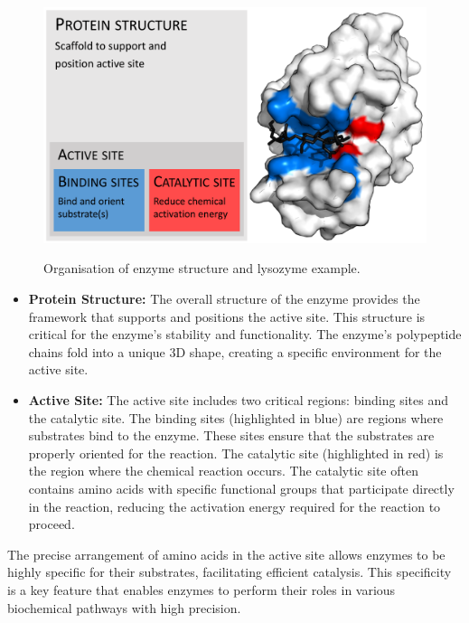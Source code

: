 \begin{figure}[hbt]
    \centering
    \begin{minipage}[t]{.9\textwidth}
    \caption{Organisation of enzyme structure and lysozyme example.}
    \includegraphics[width=1\textwidth]{img/EnzymeStructure.svg.png}\\
    \label{fig:EnzymeStructure}
    \end{minipage}
\end{figure}

\begin{itemize}
    \item \textbf{Protein Structure:} The overall structure of the enzyme provides the framework that supports and positions the active site. This structure is critical for the enzyme's stability and functionality. The enzyme's polypeptide chains fold into a unique 3D shape, creating a specific environment for the active site.
    \item \textbf{Active Site:} The active site includes two critical regions: binding sites and the catalytic site. The binding sites (highlighted in blue) are regions where substrates bind to the enzyme. These sites ensure that the substrates are properly oriented for the reaction. The catalytic site (highlighted in red) is the region where the chemical reaction occurs. The catalytic site often contains amino acids with specific functional groups that participate directly in the reaction, reducing the activation energy required for the reaction to proceed.
\end{itemize}

The precise arrangement of amino acids in the active site allows enzymes to be highly specific for their substrates, facilitating efficient catalysis. This specificity is a key feature that enables enzymes to perform their roles in various biochemical pathways with high precision.

